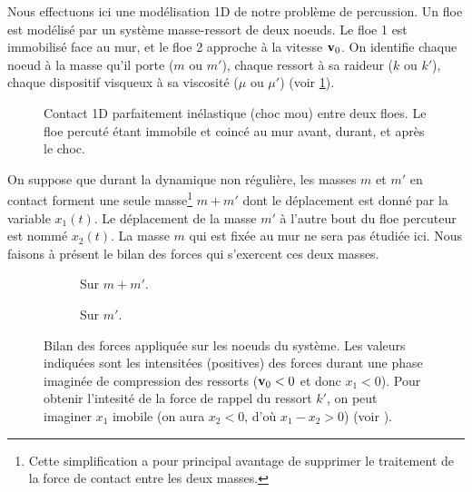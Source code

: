Nous effectuons ici une modélisation 1D de notre problème de percussion. Un floe est modélisé par un système masse-ressort de deux noeuds. Le floe 1 est immobilisé face au mur, et le floe 2 approche à la vitesse $\bm{\mathrm{v}}_0$. On identifie chaque noeud à la masse qu'il porte ($m$ ou $m'$), chaque ressort à sa raideur ($k$ ou $k'$), chaque dispositif visqueux à sa viscosité ($\mu$ ou $\mu'$) (voir \cref{fig:contact1d}).
\begin{figure}[!h]
    \centering
    \caption{Contact 1D parfaitement inélastique (choc mou) entre deux floes. Le floe percuté étant immobile et coincé au mur avant, durant, et après le choc.}
    \label{fig:contact1d}
\end{figure}

\noindent On suppose que durant la dynamique non régulière, les masses $m$ et $m'$ en contact forment une seule masse\footnote{Cette simplification a pour principal avantage de supprimer le traitement de la force de contact entre les deux masses.}
$m+m'$ dont
le déplacement est donné par la variable $x_1(t)$. Le déplacement de la masse $m'$ à l'autre bout du floe percuteur est nommé
$x_2(t)$. La masse $m$ qui est fixée au mur ne sera pas étudiée ici. Nous faisons à présent le bilan des forces qui
s'exercent ces
deux masses.
\begin{figure}[!h]
     \begin{subfigure}[b]{0.4\textwidth}
         \centering
         \caption{Sur $m+m'$.}
         \label{fig:bilan11}
     \end{subfigure}
     \begin{subfigure}[b]{0.3\textwidth}
         \centering
         \caption{Sur $m'$.}
         \label{fig:bilan12}
     \end{subfigure}
        \caption{Bilan des forces appliquée sur les noeuds du système. Les valeurs indiquées sont les intensitées
            (positives) des forces durant une phase imaginée de compression des ressorts ($\bm{\mathrm{v}}_0 <0$ et donc
            $x_1 <0$). Pour obtenir l'intesité de la force de rappel du ressort $k'$, on peut imaginer $x_1$ imobile
            (on aura $x_2 < 0$, d'où $x_1 - x_2 > 0$) (voir \parencite{homodeling}).}
        \label{fig:bilan}
\end{figure}

